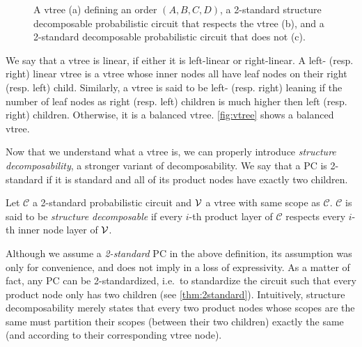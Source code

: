 \begin{figure}[t]
\begin{subfigure}[t]{0.35\textwidth}
{
    }
    \caption{}
    \label{fig:norespect}
  \end{subfigure}
  \caption{A vtree (a) defining an order $(A,B,C,D)$, a 2-standard structure decomposable
    probabilistic circuit that respects the vtree (b), and a 2-standard decomposable probabilistic
    circuit that does not (c).}
  \label{fig:vtreeresp}
\end{figure}

We say that a vtree is linear, if either it is left-linear or right-linear. A left- (resp. right)
linear vtree is a vtree whose inner nodes all have leaf nodes on their right (resp. left) child.
Similarly, a vtree is said to be left- (resp. right) leaning if the number of leaf nodes as right
(resp. left) children is much higher then left (resp. right) children. Otherwise, it is a balanced
vtree. \cref{fig:vtree} shows a balanced vtree.

Now that we understand what a vtree is, we can properly introduce \emph{structure decomposability},
a stronger variant of decomposability. We say that a PC is 2-standard if it is standard and all of
its product nodes have exactly two children.

\begin{definition}
  Let $\mathcal{C}$ a 2-standard probabilistic circuit and $\operatorname{\mathcal{V}}$ a vtree with same scope as
  $\mathcal{C}$. $\mathcal{C}$ is said to be \emph{structure decomposable} if every $i$-th product
  layer of $\mathcal{C}$ respects every $i$-th inner node layer of $\operatorname{\mathcal{V}}$.
\end{definition}

Although we assume a \emph{2-standard} PC in the above definition, its assumption was only for
convenience, and does not imply in a loss of expressivity. As a matter of fact, any PC can be
2-standardized, i.e.\ to standardize the circuit such that every product node only has two children
(see \cref{thm:2standard}). Intuitively, structure decomposability merely states that every two
product nodes whose scopes are the same must partition their scopes (between their two children)
exactly the same (and according to their corresponding vtree node).

